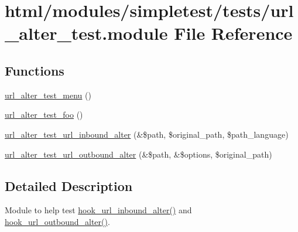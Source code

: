 \hypertarget{url__alter__test_8module}{
\section{html/modules/simpletest/tests/url\_\-alter\_\-test.module File Reference}
\label{url__alter__test_8module}
}
\subsection*{Functions}
\begin{DoxyCompactItemize}
\item 
\hyperlink{url__alter__test_8module_a5f65360466b54f792d0d1c7567a852be}{url\_\-alter\_\-test\_\-menu} ()
\item 
\hyperlink{url__alter__test_8module_aef905b190ed8a2208c811f8477986c6e}{url\_\-alter\_\-test\_\-foo} ()
\item 
\hyperlink{url__alter__test_8module_a4f7e4dc47e41c096798686ede0bf2017}{url\_\-alter\_\-test\_\-url\_\-inbound\_\-alter} (\&\$path, \$original\_\-path, \$path\_\-language)
\item 
\hyperlink{url__alter__test_8module_a3ea0dfd88b5356e660c94bb4b832a487}{url\_\-alter\_\-test\_\-url\_\-outbound\_\-alter} (\&\$path, \&\$options, \$original\_\-path)
\end{DoxyCompactItemize}


\subsection{Detailed Description}
Module to help test \hyperlink{group__hooks_ga32da9c3f1486c293818f30fa4037e33f}{hook\_\-url\_\-inbound\_\-alter()} and \hyperlink{group__hooks_gaae456dc4459a029bc099079814ded61f}{hook\_\-url\_\-outbound\_\-alter()}. 

